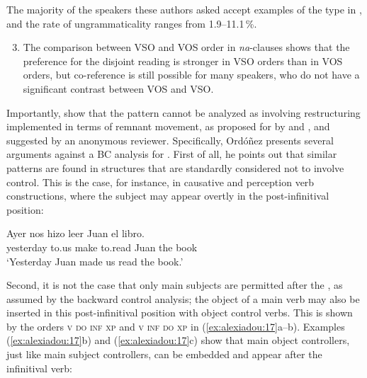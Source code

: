 \documentclass[output=paper]{langsci/langscibook}
\begin{document}
The majority of the speakers these authors asked accept examples of the type in , and the rate of ungrammaticality ranges from 1.9--11.1\,\%.  

\begin{enumerate}\setcounter{enumi}{2}
\item The comparison between VSO and VOS order in \textit{na}{}-clauses shows that the preference for the disjoint reading is stronger in VSO orders than in VOS orders, but co-reference is still possible for many speakers, who do not have a significant contrast between VOS and VSO. 
\end{enumerate}

Importantly, \citet{Tsakali2017} show that the  pattern cannot be analyzed as involving restructuring implemented in terms of remnant movement, as proposed for  by \citet{Ordóñez2009} and \citet{Herbeck2013}, and suggested by an anonymous reviewer. Specifically, Ordóñez presents several arguments against a BC analysis for . First of all, he points out that similar patterns are found in structures that are standardly considered not to involve control. This is the case, for instance, in causative and perception verb constructions, where the subject may appear overtly in the post-infinitival position:

\ea%
    \label{ex:alexiadou:16}
    \gll Ayer     nos   hizo   leer   Juan   el libro.  \\
           yesterday   to.us   make   to.read Juan   the book  \\
    \glt   ‘Yesterday Juan made us read the book.’  
    \z

           

Second, it is not the case that only main subjects are permitted after the , as assumed by the backward control analysis; the object of a main verb may also be inserted in this post-infinitival position with object control verbs. This is shown by the orders \textsc{v do inf xp} and \textsc{v inf do xp} in (\ref{ex:alexiadou:17}a--b). Examples (\ref{ex:alexiadou:17}b) and (\ref{ex:alexiadou:17}c) show that main object controllers, just like main subject controllers, can be embedded and appear after the infinitival verb:
\end{document}

